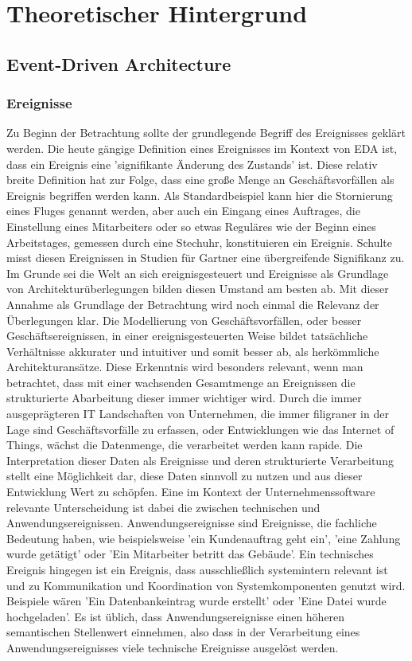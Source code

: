 \section{Theoretischer Hintergrund}
\subsection{Event-Driven Architecture}
\subsubsection*{Ereignisse}
Zu Beginn der Betrachtung sollte der grundlegende Begriff des Ereignisses geklärt werden. Die heute gängige Definition eines Ereignisses im Kontext von \ac*{EDA} ist, dass ein Ereignis eine 'signifikante Änderung des Zustands' ist. \cite[Vgl.][S. 4]{EDA2006} Diese relativ breite Definition hat zur Folge, dass eine große Menge an Geschäftsvorfällen als Ereignis begriffen werden kann. Als Standardbeispiel kann hier die Stornierung eines Fluges genannt werden, aber auch ein Eingang eines Auftrages, die Einstellung eines Mitarbeiters oder so etwas Reguläres wie der Beginn eines Arbeitstages, gemessen durch eine Stechuhr, konstituieren ein Ereignis. Schulte misst diesen Ereignissen in Studien für Gartner eine übergreifende Signifikanz zu. Im Grunde sei die Welt an sich ereignisgesteuert und Ereignisse als Grundlage von Architekturüberlegungen bilden diesen Umstand am besten ab. \cite[Vgl. ][S. 2]{schulte2003growing} Mit dieser Annahme als Grundlage der Betrachtung wird noch einmal die Relevanz der Überlegungen klar. Die Modellierung von Geschäftsvorfällen, oder besser Geschäftsereignissen, in einer ereignisgesteuerten Weise bildet tatsächliche Verhältnisse akkurater und intuitiver und somit besser ab, als herkömmliche Architekturansätze. \cite[Vgl. ][S. 13]{EDA2010} Diese Erkenntnis wird besonders relevant, wenn man betrachtet, dass mit einer wachsenden Gesamtmenge an Ereignissen die strukturierte Abarbeitung dieser immer wichtiger wird. Durch die immer ausgeprägteren \ac{IT} Landschaften von Unternehmen, die immer filigraner in der Lage sind Geschäftsvorfälle zu erfassen, oder Entwicklungen wie das Internet of Things, wächst die Datenmenge, die verarbeitet werden kann rapide. Die Interpretation dieser Daten als Ereignisse und deren strukturierte Verarbeitung stellt eine Möglichkeit dar, diese Daten sinnvoll zu nutzen und aus dieser Entwicklung Wert zu schöpfen. \cite[Vgl. ][S. 16]{EDA2010} 
Eine im Kontext der Unternehmenssoftware relevante Unterscheidung ist dabei die zwischen technischen und Anwendungsereignissen. Anwendungsereignisse sind Ereignisse, die fachliche Bedeutung haben, wie beispielsweise 'ein Kundenauftrag geht ein', 'eine Zahlung wurde getätigt' oder 'Ein Mitarbeiter betritt das Gebäude'. Ein technisches Ereignis hingegen ist ein Ereignis, dass ausschließlich systemintern relevant ist und zu Kommunikation und Koordination von Systemkomponenten genutzt wird. Beispiele wären 'Ein Datenbankeintrag wurde erstellt' oder 'Eine Datei wurde hochgeladen'. Es ist üblich, dass Anwendungsereignisse einen höheren semantischen Stellenwert einnehmen, also dass in der Verarbeitung eines Anwendungsereignisses viele technische Ereignisse ausgelöst werden. \cite[Vgl. ][S. 245f]{CLOUD2021}
